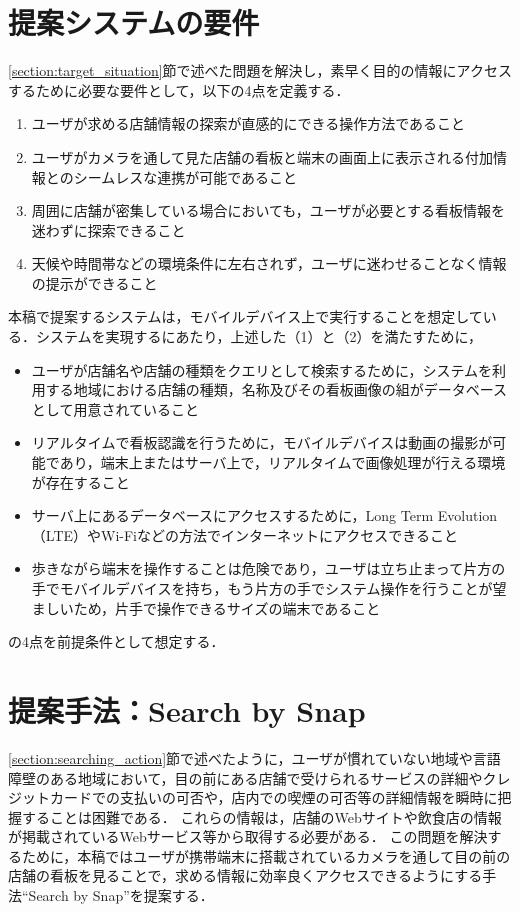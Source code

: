 \section{提案システムの要件}
  \label{subsection:requirement}
  \ref{section:target_situation}節で述べた問題を解決し，素早く目的の情報にアクセスするために必要な要件として，以下の4点を定義する．
  \begin{enumerate}
    \item ユーザが求める店舗情報の探索が直感的にできる操作方法であること
    \item ユーザがカメラを通して見た店舗の看板と端末の画面上に表示される付加情報とのシームレスな連携が可能であること
    \item 周囲に店舗が密集している場合においても，ユーザが必要とする看板情報を迷わずに探索できること
    \item 天候や時間帯などの環境条件に左右されず，ユーザに迷わせることなく情報の提示ができること
  \end{enumerate}
  本稿で提案するシステムは，モバイルデバイス上で実行することを想定している．システムを実現するにあたり，上述した（1）と（2）を満たすために，
  \begin{itemize}
    \item ユーザが店舗名や店舗の種類をクエリとして検索するために，システムを利用する地域における店舗の種類，名称及びその看板画像の組がデータベースとして用意されていること
    \item リアルタイムで看板認識を行うために，モバイルデバイスは動画の撮影が可能であり，端末上またはサーバ上で，リアルタイムで画像処理が行える環境が存在すること
    \item サーバ上にあるデータベースにアクセスするために，Long Term Evolution（LTE）やWi-Fiなどの方法でインターネットにアクセスできること
    \item 歩きながら端末を操作することは危険であり，ユーザは立ち止まって片方の手でモバイルデバイスを持ち，もう片方の手でシステム操作を行うことが望ましいため，片手で操作できるサイズの端末であること
  \end{itemize}
  の4点を前提条件として想定する．

\section{提案手法：Search by Snap}
\label{section:design_sbs}
  \ref{section:searching_action}節で述べたように，ユーザが慣れていない地域や言語障壁のある地域において，目の前にある店舗で受けられるサービスの詳細やクレジットカードでの支払いの可否や，店内での喫煙の可否等の詳細情報を瞬時に把握することは困難である．
  これらの情報は，店舗のWebサイトや飲食店の情報が掲載されているWebサービス等から取得する必要がある．
  この問題を解決するために，本稿ではユーザが携帯端末に搭載されているカメラを通して目の前の店舗の看板を見ることで，求める情報に効率良くアクセスできるようにする手法``Search by Snap''を提案する．
  
